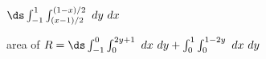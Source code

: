 {$\ds \int_{-1}^{1}\int_{(x-1)/2}^{(1-x)/2} \ dy \ dx$
}
{\noindent \begin{minipage}{\linewidth}
\end{minipage}

area of $R = \ds \int_{-1}^0\int_{0}^{2y+1} \ dx \ dy + \int_{0}^1\int_{0}^{1-2y} \ dx \ dy$

}
